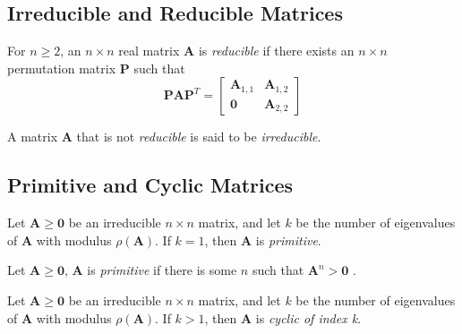 \subsection{Irreducible and Reducible Matrices}
				
\begin{definition}
For $n \ge 2$, an $n \times n$ real matrix $\mathbf{A}$ is \textit{reducible} if there exists an $n \times n$ permutation matrix $\mathbf{P}$ such that
	\begin{equation*}
		\mathbf{P}\mathbf{A}\mathbf{P}^{T} = 
		\begin{bmatrix} 
		\mathbf{A}_{1,1} & \mathbf{A}_{1,2} \\ 
		\mathbf{0} & \mathbf{A}_{2,2} 
		\end{bmatrix}
	\end{equation*}
\end{definition}

\begin{definition}
A matrix $\mathbf{A}$ that is not \textit{reducible} is said to be \textit{irreducible}.
\end{definition}

\subsection{Primitive and Cyclic Matrices}
\label{PrimMatrix}
			
\begin{definition}
Let $\mathbf{A} \ge \mathbf{0}$ be an irreducible $n \times n$ matrix, and let $k$ be the number of eigenvalues of $\mathbf{A}$ with modulus $\rho(\mathbf{A})$. If $k = 1$, then $\mathbf{A}$ is \textit{primitive}.
\end{definition}

\begin{definition}
Let $\mathbf{A} \ge \mathbf{0}$, $\mathbf{A}$ is \textit{primitive} if there is some $n$ such that $\mathbf{A}^{n} > \mathbf{0}$ \cite{horn_matrix_2012}.
\end{definition}


\begin{definition}
Let $\mathbf{A} \ge \mathbf{0}$ be an irreducible $n \times n$ matrix, and let $k$ be the number of eigenvalues of $\mathbf{A}$ with modulus $\rho(\mathbf{A})$. If $k > 1$, then $\mathbf{A}$ is \textit{cyclic of index k}.
\end{definition}

